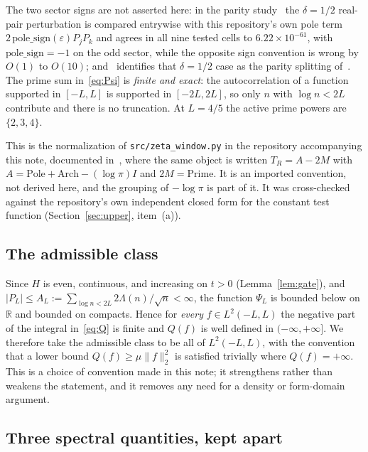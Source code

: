 \documentclass[11pt,a4paper]{article}
\theoremstyle{definition}
\theoremstyle{remark}
\newcommand{\PsiL}{\Psi_{L}}
\newcommand{\src}[1]{{\footnotesize\texttt{#1}}}
\begin{document}
The two sector signs are not asserted here: in the
parity study~\cite[\S3(c)]{ParityNote} the $\delta = 1/2$ real-pair perturbation
is compared entrywise with this repository's own pole term
$2\,\mathrm{pole\_sign}(\varepsilon)P_jP_k$ and agrees in all nine tested cells to
$6.22\times10^{-61}$, with $\mathrm{pole\_sign} = -1$ on the odd sector, while
the opposite sign convention is wrong by $O(1)$ to $O(10)$;
and~\cite[Remark 6]{ParityNote} identifies that $\delta = 1/2$ case as the parity
splitting of~\cite[Lemma 6.1]{Zhu}. The prime sum in~\eqref{eq:Psi} is
\emph{finite and exact}: the autocorrelation of a function supported in
$[-L,L]$ is supported in $[-2L,2L]$, so only $n$ with $\log n < 2L$ contribute
and there is no truncation. At $L = 4/5$ the active prime powers are
$\{2,3,4\}$.

This is the normalization of \src{src/zeta\_window.py} in the repository
accompanying this note, documented in~\cite{Sensitivity}, where the same object
is written $T_R = A - 2M$ with $A = \mathrm{Pole} + \mathrm{Arch} - (\log\pi)I$
and $2M = \mathrm{Prime}$. It is an imported convention, not derived here, and
the grouping of $-\log\pi$ is part of it. It was cross-checked against the repository's own
independent closed form for the constant test function
(Section~\ref{sec:upper}, item~(a)).

\subsection{The admissible class}

Since $H$ is even, continuous, and increasing on $t > 0$
(Lemma~\ref{lem:gate}), and $|P_L| \le A_L := \sum_{\log n < 2L}
2\Lambda(n)/\sqrt n < \infty$, the function $\PsiL$ is bounded below on
$\mathbb{R}$ and bounded on compacts. Hence for \emph{every} $f \in L^2(-L,L)$
the negative part of the integral in~\eqref{eq:Q} is finite and $Q(f)$ is
well defined in $(-\infty,+\infty]$. We therefore take the admissible class to
be all of $L^2(-L,L)$, with the convention that a lower bound
$Q(f) \ge \mu\|f\|_2^2$ is satisfied trivially where $Q(f) = +\infty$. This is a
choice of convention made in this note; it strengthens rather than weakens the
statement, and it removes any need for a density or form-domain argument.

\subsection{Three spectral quantities, kept apart}
\end{document}
